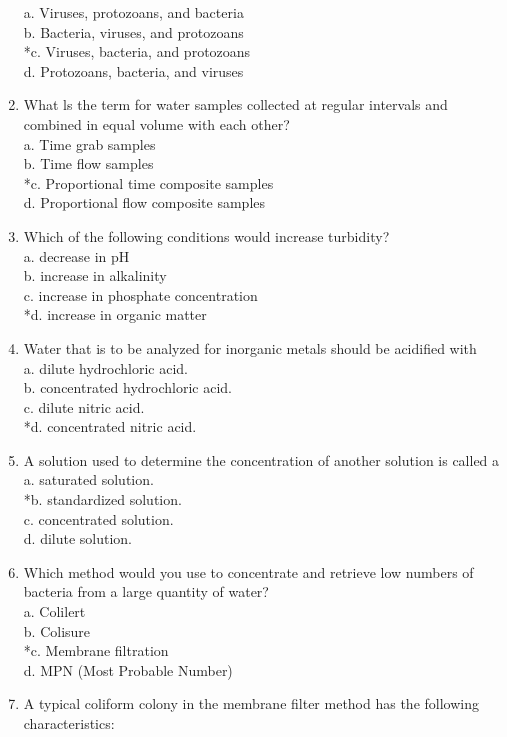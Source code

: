 \begin{enumerate}[1.]
a. Viruses, protozoans, and bacteria\\
b. Bacteria, viruses, and protozoans\\
*c. Viruses, bacteria, and protozoans\\
d. Protozoans, bacteria, and viruses\\
\item 	What ls the term for water samples collected at regular intervals and combined in equal volume with each other?\\
a.  Time grab samples\\
b.  Time flow samples\\
*c. Proportional time composite samples\\
d. Proportional flow composite samples\\
\item Which of the following conditions would increase turbidity?\\
a.	decrease in pH\\
b.	increase in alkalinity\\
c.	 increase in phosphate concentration\\
*d.	increase in organic matter\\
\item Water that is to be analyzed for inorganic metals should be acidified with\\
a. dilute hydrochloric acid.\\
b. concentrated hydrochloric acid.\\
c. dilute nitric acid.\\
*d. concentrated nitric acid.
\item A solution used to determine the concentration of another solution is called a\\
a. saturated solution.\\
*b. standardized solution.\\
c. concentrated solution.\\
d. dilute solution.\\
\item Which method would you use to concentrate and retrieve low numbers of bacteria from a large quantity of water?\\
a. Colilert\\
b. Colisure\\
*c. Membrane filtration\\
d. MPN (Most Probable Number)\\
\item A typical coliform colony in the membrane filter method has the following characteristics:\\

\end{enumerate}
